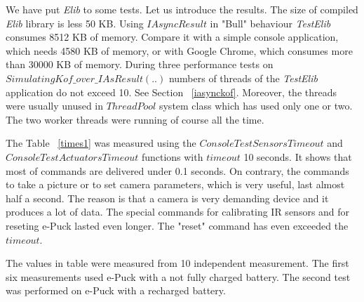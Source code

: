   We have put {\it Elib} to some tests. Let us introduce the results.
  The size of compiled {\it Elib} library is less 50 KB.
  Using $IAsyncResult$ in "Bull" behaviour  {\it TestElib} consumes 8512 KB of memory.
  Compare it with a simple console application, which needs 4580 KB of memory, or with Google Chrome, 
  which consumes more than 30000 KB of memory.
  During three performance tests on $SimulatingKof\_over\_IAsResult(..)$
  numbers of threads of the {\it TestElib} application do not exceed 10. 
  See Section ~\ref{iasynckof}. Moreover, the threads were usually unused
  in $ThreadPool$ system class which has used only one or two. 
  The two worker threads were running of course all the time.

  The Table ~\ref{times1}  was measured using the $ConsoleTestSensorsTimeout$ and
  $ConsoleTestActuatorsTimeout$ functions with $timeout$ 10 seconds.
  It shows that most of commands are delivered under 0.1 seconds. 
  On contrary, the commands to take a picture or to set camera parameters, 
  which is very useful, last almost half a second. 
  The reason is that a camera is very demanding device and it produces a lot of data.
  The special commands for calibrating IR sensors and for reseting e-Puck lasted even longer.
  The "reset" command has even exceeded the $timeout$.

  The values in table were measured from 10 independent measurement. 
  The first six measurements used e-Puck with a not fully charged battery.
  The second test was performed on e-Puck with a recharged battery.



